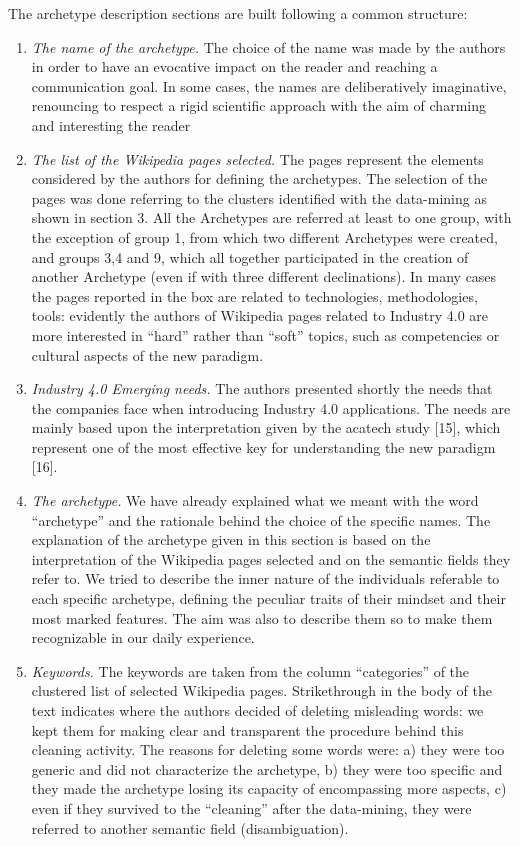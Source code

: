 \documentclass[]{book}
\theoremstyle{definition}
\theoremstyle{definition}
\theoremstyle{definition}
\theoremstyle{remark}
\begin{document}
The archetype description sections are built following a common
structure:

\begin{enumerate}
\def\labelenumi{\arabic{enumi}.}
\item
  \emph{The name of the archetype.} The choice of the name was made by
  the authors in order to have an evocative impact on the reader and
  reaching a communication goal. In some cases, the names are
  deliberatively imaginative, renouncing to respect a rigid scientific
  approach with the aim of charming and interesting the reader
\item
  \emph{The list of the Wikipedia pages selected.} The pages represent
  the elements considered by the authors for defining the archetypes.
  The selection of the pages was done referring to the clusters
  identified with the data-mining as shown in section 3. All the
  Archetypes are referred at least to one group, with the exception of
  group 1, from which two different Archetypes were created, and groups
  3,4 and 9, which all together participated in the creation of another
  Archetype (even if with three different declinations). In many cases
  the pages reported in the box are related to technologies,
  methodologies, tools: evidently the authors of Wikipedia pages related
  to Industry 4.0 are more interested in ``hard'' rather than ``soft''
  topics, such as competencies or cultural aspects of the new paradigm.
\item
  \emph{Industry 4.0 Emerging needs.} The authors presented shortly the
  needs that the companies face when introducing Industry 4.0
  applications. The needs are mainly based upon the interpretation given
  by the acatech study {[}15{]}, which represent one of the most
  effective key for understanding the new paradigm {[}16{]}.
\item
  \emph{The archetype.} We have already explained what we meant with the
  word ``archetype'' and the rationale behind the choice of the specific
  names. The explanation of the archetype given in this section is based
  on the interpretation of the Wikipedia pages selected and on the
  semantic fields they refer to. We tried to describe the inner nature
  of the individuals referable to each specific archetype, defining the
  peculiar traits of their mindset and their most marked features. The
  aim was also to describe them so to make them recognizable in our
  daily experience.
\item
  \emph{Keywords.} The keywords are taken from the column ``categories''
  of the clustered list of selected Wikipedia pages. Strikethrough in
  the body of the text indicates where the authors decided of deleting
  misleading words: we kept them for making clear and transparent the
  procedure behind this cleaning activity. The reasons for deleting some
  words were: a) they were too generic and did not characterize the
  archetype, b) they were too specific and they made the archetype
  losing its capacity of encompassing more aspects, c) even if they
  survived to the ``cleaning'' after the data-mining, they were referred
  to another semantic field (disambiguation).
\end{enumerate}
\end{document}
